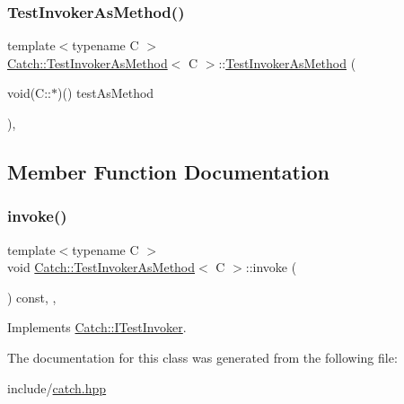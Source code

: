 \subsubsection{\texorpdfstring{Test\+Invoker\+As\+Method()}{TestInvokerAsMethod()}}
{\footnotesize\ttfamily template$<$typename C $>$ \\
\mbox{\hyperlink{classCatch_1_1TestInvokerAsMethod}{Catch\+::\+Test\+Invoker\+As\+Method}}$<$ C $>$\+::\mbox{\hyperlink{classCatch_1_1TestInvokerAsMethod}{Test\+Invoker\+As\+Method}} (\begin{DoxyParamCaption}\item[{void(C\+::$\ast$)()}]{test\+As\+Method }\end{DoxyParamCaption})\hspace{0.3cm}{\ttfamily [inline]}, {\ttfamily [noexcept]}}



\subsection{Member Function Documentation}
\mbox{\label{classCatch_1_1TestInvokerAsMethod_a8115a06efe273f4112ec0b5452c1b5f2}} 
\subsubsection{\texorpdfstring{invoke()}{invoke()}}
{\footnotesize\ttfamily template$<$typename C $>$ \\
void \mbox{\hyperlink{classCatch_1_1TestInvokerAsMethod}{Catch\+::\+Test\+Invoker\+As\+Method}}$<$ C $>$\+::invoke (\begin{DoxyParamCaption}{ }\end{DoxyParamCaption}) const\hspace{0.3cm}{\ttfamily [inline]}, {\ttfamily [override]}, {\ttfamily [virtual]}}



Implements \mbox{\hyperlink{structCatch_1_1ITestInvoker_a6fcd5c5b67d6d5ade6491ff33411ca7f}{Catch\+::\+I\+Test\+Invoker}}.



The documentation for this class was generated from the following file\+:\begin{DoxyCompactItemize}
\item 
include/\mbox{\hyperlink{catch_8hpp}{catch.\+hpp}}\end{DoxyCompactItemize}
